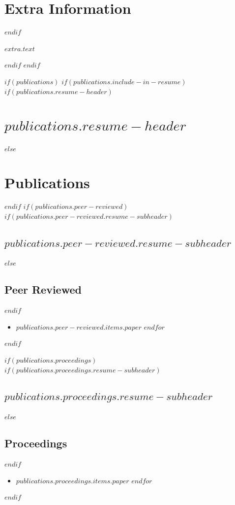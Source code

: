 \documentclass[letterpaper,10pt,final,sans]{moderncv}
\providecommand{\tightlist}{%
  \setlength{\itemsep}{8pt}\setlength{\parskip}{0pt}}
\begin{document}
\section{Extra Information}
$endif$
\small
\begin{lrbox}{\extrabox}%
\begin{minipage}[t]{\maincolumnwidth}
\renewcommand{\quote}[1]{#1\par}
\renewcommand{\tightlist}{\setlength{\itemsep}{0.25em}\setlength{\parsep}{0pt}\setlength{\parskip}{0pt}}
$extra.text$
\end{minipage}%
\end{lrbox}
\cvitem{}{\usebox{\extrabox}}
$endif$
$endif$

$if(publications)$
$if(publications.include-in-resume)$
$if(publications.resume-header)$
\section{$publications.resume-header$}
$else$
\section{Publications}
$endif$
$if(publications.peer-reviewed)$
$if(publications.peer-reviewed.resume-subheader)$
\subsection{$publications.peer-reviewed.resume-subheader$}
$else$
\subsection{Peer Reviewed}
$endif$
\begin{itemize}
$for(publications.peer-reviewed.items)$
\item $publications.peer-reviewed.items.paper$
$endfor$
\end{itemize}
$endif$

$if(publications.proceedings)$
$if(publications.proceedings.resume-subheader)$
\subsection{$publications.proceedings.resume-subheader$}
$else$
\subsection{Proceedings}
$endif$
\begin{itemize}
$for(publications.proceedings.items)$
\item $publications.proceedings.items.paper$
$endfor$
\end{itemize}
$endif$
\end{document}
